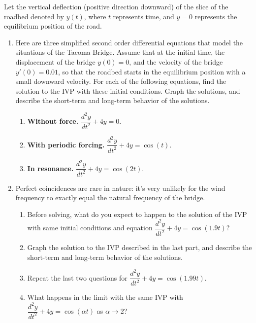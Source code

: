 \documentclass{article}
\theoremstyle{definition}
\begin{document}
Let the vertical deflection
(positive direction downward) of the slice of the roadbed denoted by $y(t)$, where $t$ represents time, and $y=0$ represents the equilibrium position of the road. 

\begin{enumerate}
\item
Here are three simplified second order differential equations that model the situations of the Tacoma Bridge. Assume that at the initial time, the displacement of the bridge $y(0)=0$, and the velocity of the bridge $y'(0)=0.01$,  so that the roadbed
starts in the equilibrium position with a small downward velocity. For each of the following equations, find the solution to the IVP with these initial conditions. Graph the solutions, and describe the short-term and long-term behavior of the solutions.
\begin{enumerate}
\item {\bf Without force.} $\dfrac{d^2y}{dt^2} + 4y = 0$.
\item {\bf With periodic forcing.} $\dfrac{d^2y}{dt^2} + 4y = \cos(t)$.
\item {\bf In resonance.} $\dfrac{d^2y}{dt^2} + 4y = \cos(2t)$.
\end{enumerate}

\item Perfect coincidences are rare in nature: it's very unlikely for the wind frequency to exactly equal the natural frequency of the bridge.
\begin{enumerate}
\item Before solving, what do you expect to happen to the solution of the IVP with same initial conditions and equation $\dfrac{d^2y}{dt^2} + 4y = \cos(1.9 t)$? 
\item Graph the solution to the IVP described in the last part, and describe the short-term and long-term behavior of the solutions.
\item Repeat the last two questions for $\dfrac{d^2y}{dt^2} + 4y = \cos(1.99 t)$.
\item What happens in the limit with the same IVP with $\dfrac{d^2y}{dt^2} + 4y = \cos(\alpha t)$ as $\alpha \to 2$?
\end{enumerate}
\end{enumerate}
\end{document}

